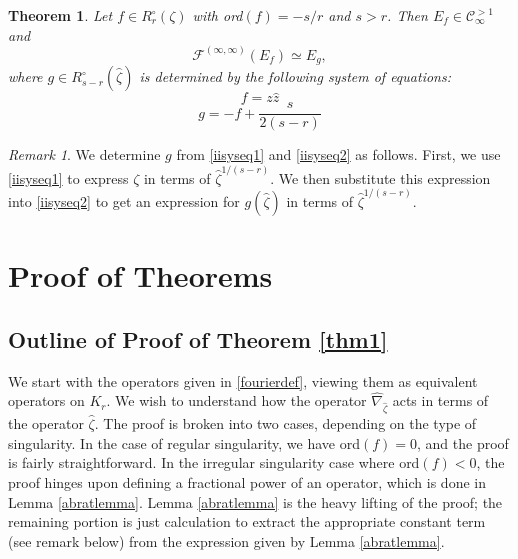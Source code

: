 \documentclass[11pt]{amsart}
\theoremstyle{plain}
\newtheorem{theorem}{Theorem}[section]
\theoremstyle{definition}
\theoremstyle{remark}
\newtheorem*{remark}{Remark}
\def\z{\hat{\zeta}}
\def\C{\mathcal{C}}
\def\comp{\circ}
\begin{document}
\begin{theorem}\label{thm3}
    Let $f\in  R^\comp_r(\zeta)$ with ord$(f)=-s/r$ and $s>r$. Then $E_f\in \C^{>1}_{\infty}$ and
\[\mathcal{F}^{(\infty, \infty)}(E_{f})\simeq E_{g},\]
where $g\in R^\comp_{s-r}(\z)$ is determined by the following system of equations:
\begin{equation}\label{iisyseq1}f=z\hat{z}
\end{equation}
\begin{equation}\label{iisyseq2} g=-f+\frac{s}{2(s-r)}
\end{equation}

\end{theorem}

\begin{remark}
  We determine $g$ from \eqref{iisyseq1} and \eqref{iisyseq2} as follows.  First, we use \eqref{iisyseq1} to express $\zeta$ in terms of $\z^{1/(s-r)}$.  We then substitute this expression into \eqref{iisyseq2} to get an expression for $g(\z)$ in terms of $\z^{1/(s-r)}$.
\end{remark}



\section{Proof of Theorems}\label{sec proofs}


\subsection{Outline of Proof of Theorem \ref{thm1}}\label{F proof subsec} We start with the operators given in \eqref{fourierdef}, viewing them as equivalent operators on $K_r$.  We wish to understand how the operator $\hat{\nabla}_{\z}$ acts in terms of the operator $\z$.  The proof is broken into two cases, depending on the type of singularity. In the case of regular singularity, we have ord$(f)=0$, and the proof is fairly straightforward.  In the irregular singularity case where ord$(f)<0$, the proof hinges upon defining a fractional power of an operator, which is done in Lemma \ref{abratlemma}.  Lemma \ref{abratlemma} is the heavy lifting of the proof; the remaining portion is just calculation to extract the appropriate constant term (see remark below) from the expression given by Lemma \ref{abratlemma}.
\end{document}
